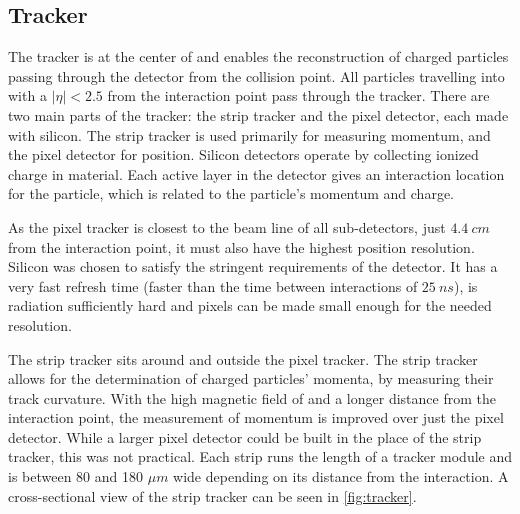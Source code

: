 \subsection{Tracker}

The tracker is at the center of \CMS and enables the reconstruction of charged particles passing through the detector from the collision point.  All particles travelling into \CMS with a \ensuremath{|\eta| < 2.5} from the interaction point pass through the tracker.  There are two main parts of the tracker: the strip tracker and the pixel detector, each made with silicon.  The strip tracker is used primarily for measuring momentum, and the pixel detector for position.
Silicon detectors operate by collecting ionized charge in material.  Each active layer in the detector gives an interaction location for the particle, which is related to the particle's momentum and charge. 

As the pixel tracker is closest to the beam line of all sub-detectors, just \ensuremath{\SI{4.4}{cm}} from the interaction point, it must also have the highest position resolution.  Silicon was chosen to satisfy the stringent requirements of the detector. It has a very fast refresh time (faster than the time between interactions of \ensuremath{\SI{25}{ns}}), is radiation sufficiently hard and pixels can be made small enough for the needed resolution.  



The strip tracker sits around and outside the pixel tracker.  The strip tracker allows for the determination of charged particles' momenta, by measuring their track curvature.  With the high magnetic field of \CMS and a longer distance from the interaction point, the measurement of momentum is improved over just the pixel detector. While a larger pixel detector could be built in the place of the strip tracker, this was not practical.  Each strip runs the length of a tracker module and is between 80 and 180 \ensuremath{\mu m} wide depending on its distance from the interaction. A cross-sectional view of the strip tracker can be seen in \ref{fig:tracker}.


